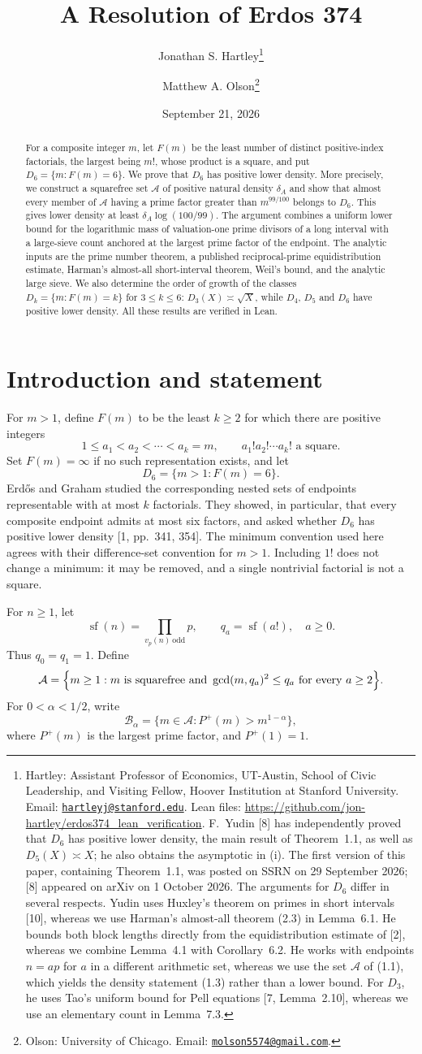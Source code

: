 \documentclass[letterpaper]{article}
\title{A Resolution of Erdos 374}
\author{Jonathan S. Hartley\thanks{Hartley: Assistant Professor of Economics, UT-Austin, School of Civic Leadership, and Visiting Fellow, Hoover Institution at Stanford University. Email: \href{mailto:hartleyj@stanford.edu}{\texttt{hartleyj@stanford.edu}}. Lean files: \url{https://github.com/jon-hartley/erdos374_lean_verification}. F.~Yudin [8] has independently proved that $D_6$ has positive lower density, the main result of Theorem~1.1, as well as $D_5(X)\asymp X$; he also obtains the asymptotic in (i). The first version of this paper, containing Theorem~1.1, was posted on SSRN on 29 September 2026; [8] appeared on arXiv on 1 October 2026. The arguments for $D_6$ differ in several respects. Yudin uses Huxley's theorem on primes in short intervals [10], whereas we use Harman's almost-all theorem (2.3) in Lemma~6.1. He bounds both block lengths directly from the equidistribution estimate of [2], whereas we combine Lemma~4.1 with Corollary~6.2. He works with endpoints $n=ap$ for $a$ in a different arithmetic set, whereas we use the set $\mathcal A$ of (1.1), which yields the density statement (1.3) rather than a lower bound. For $D_3$, he uses Tao's uniform bound for Pell equations [7, Lemma~2.10], whereas we use an elementary count in Lemma~7.3.} \and Matthew A. Olson\thanks{Olson: University of Chicago. Email: \href{mailto:molson5574@gmail.com}{\texttt{molson5574@gmail.com}}.}}
\date{September 21, 2026}
\theoremstyle{definition}
\theoremstyle{remark}
\numberwithin{equation}{section}
\newcommand{\sfk}{\operatorname{sf}}
\begin{document}
{\let\footnotesize\scriptsize\maketitle}

\begin{abstract}
For a composite integer $m$, let $F(m)$ be the least number of distinct positive-index
factorials, the largest being $m!$, whose product is a square, and put $D_6=\{m:F(m)=6\}$.
We prove that $D_6$ has positive lower density. More precisely, we construct
a squarefree set $\mathcal A$ of positive natural density $\delta_A$ and show that almost every member of $\mathcal A$
having a prime factor greater than $m^{99/100}$ belongs to $D_6$. This gives lower density at least
$\delta_A\log(100/99)$. The argument combines a uniform lower bound for the logarithmic mass
of valuation-one prime divisors of a long interval with a large-sieve count anchored at the
largest prime factor of the endpoint. The analytic inputs are the prime number theorem,
a published reciprocal-prime equidistribution estimate, Harman's almost-all short-interval
theorem, Weil's bound, and the analytic large sieve.
We also determine the order of growth of the classes $D_k=\{m:F(m)=k\}$ for $3\le k\le 6$:
$D_3(X)\asymp\sqrt X$,
while $D_4$, $D_5$ and $D_6$ have positive lower density. All these results are verified in Lean.
\end{abstract}

\section{Introduction and statement}

For $m>1$, define $F(m)$ to be the least $k\ge 2$ for which there are positive integers
\[
  1\le a_1<a_2<\cdots<a_k=m,\qquad a_1!a_2!\cdots a_k! \text{ a square.}
\]
Set $F(m)=\infty$ if no such representation exists, and let
\[
  D_6=\{m>1:F(m)=6\}.
\]
Erd\H{o}s and Graham studied the corresponding nested sets of endpoints representable with at
most $k$ factorials. They showed, in particular, that every composite endpoint admits at most
six factors, and asked whether $D_6$ has positive lower density [1, pp.~341, 354]. The minimum
convention used here agrees with their difference-set convention for $m>1$. Including $1!$ does
not change a minimum: it may be removed, and a single nontrivial factorial is not a square.

For $n\ge 1$, let
\[
  \sfk(n)=\prod_{v_p(n)\ \text{odd}}p,\qquad q_a=\sfk(a!),\quad a\ge 0.
\]
Thus $q_0=q_1=1$. Define
\begin{equation}
  \mathcal A=\Bigl\{m\ge 1: m \text{ is squarefree and } \gcd(m,q_a)^2\le q_a \text{ for every } a\ge 2\Bigr\}.
\end{equation}
For $0<\alpha<1/2$, write
\begin{equation}
  \mathcal B_\alpha=\{m\in\mathcal A:P^+(m)>m^{1-\alpha}\},
\end{equation}
where $P^+(m)$ is the largest prime factor, and $P^+(1)=1$.
\end{document}
